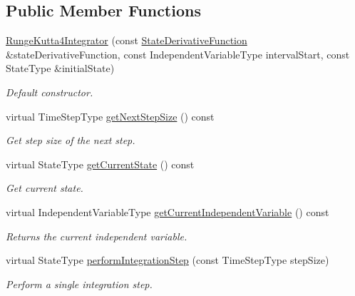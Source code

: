 \subsection*{Public Member Functions}
\begin{DoxyCompactItemize}
\item 
\hyperlink{classtudat_1_1numerical__integrators_1_1RungeKutta4Integrator_aea7ff2f42b499184b8378bc45fc8deef}{Runge\+Kutta4\+Integrator} (const \hyperlink{classtudat_1_1numerical__integrators_1_1NumericalIntegrator_a0d0a5d48ebaf1f5ad9cd7a73b44be0fc}{State\+Derivative\+Function} \&state\+Derivative\+Function, const Independent\+Variable\+Type interval\+Start, const State\+Type \&initial\+State)
\begin{DoxyCompactList}\small\item\em Default constructor. \end{DoxyCompactList}\item 
virtual Time\+Step\+Type \hyperlink{classtudat_1_1numerical__integrators_1_1RungeKutta4Integrator_a58cc12e96d7943c3a818d56fa25a9262}{get\+Next\+Step\+Size} () const 
\begin{DoxyCompactList}\small\item\em Get step size of the next step. \end{DoxyCompactList}\item 
virtual State\+Type \hyperlink{classtudat_1_1numerical__integrators_1_1RungeKutta4Integrator_a072af689041e40a752b076074f605aaf}{get\+Current\+State} () const 
\begin{DoxyCompactList}\small\item\em Get current state. \end{DoxyCompactList}\item 
virtual Independent\+Variable\+Type \hyperlink{classtudat_1_1numerical__integrators_1_1RungeKutta4Integrator_a6dabe80255676fe59945cb26d4e82f87}{get\+Current\+Independent\+Variable} () const 
\begin{DoxyCompactList}\small\item\em Returns the current independent variable. \end{DoxyCompactList}\item 
virtual State\+Type \hyperlink{classtudat_1_1numerical__integrators_1_1RungeKutta4Integrator_abaa09d78b7b023d900cecb8fcbdcdca6}{perform\+Integration\+Step} (const Time\+Step\+Type step\+Size)
\begin{DoxyCompactList}\small\item\em Perform a single integration step. \end{DoxyCompactList}\item 

\end{DoxyCompactItemize}
